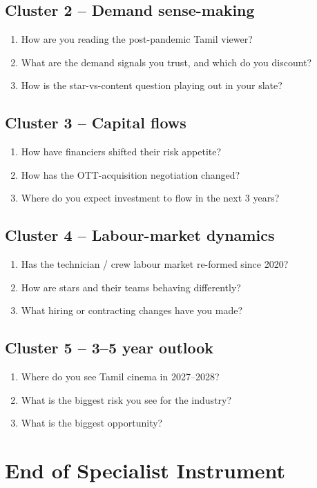 \subsection*{Cluster 2 -- Demand sense-making}
\begin{enumerate}[resume,itemsep=2pt]
\item How are you reading the post-pandemic Tamil viewer?
\item What are the demand signals you trust, and which do you
      discount?
\item How is the star-vs-content question playing out in your slate?
\end{enumerate}

\subsection*{Cluster 3 -- Capital flows}
\begin{enumerate}[resume,itemsep=2pt]
\item How have financiers shifted their risk appetite?
\item How has the OTT-acquisition negotiation changed?
\item Where do you expect investment to flow in the next 3 years?
\end{enumerate}

\subsection*{Cluster 4 -- Labour-market dynamics}
\begin{enumerate}[resume,itemsep=2pt]
\item Has the technician / crew labour market re-formed since 2020?
\item How are stars and their teams behaving differently?
\item What hiring or contracting changes have you made?
\end{enumerate}

\subsection*{Cluster 5 -- 3--5 year outlook}
\begin{enumerate}[resume,itemsep=2pt]
\item Where do you see Tamil cinema in 2027--2028?
\item What is the biggest risk you see for the industry?
\item What is the biggest opportunity?
\end{enumerate}

\section*{End of Specialist Instrument}
